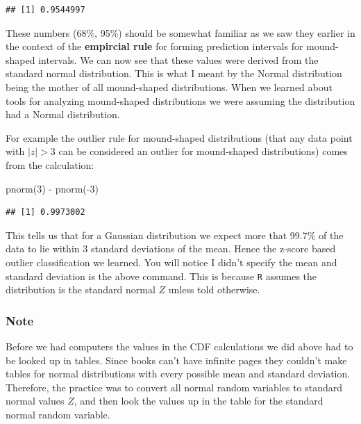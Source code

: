 \documentclass[
]{book}
\newenvironment{Shaded}{\begin{snugshade}}{\end{snugshade}}
\newcommand{\DecValTok}[1]{\textcolor[rgb]{0.00,0.00,0.81}{#1}}
\newcommand{\FunctionTok}[1]{\textcolor[rgb]{0.00,0.00,0.00}{#1}}
\newcommand{\NormalTok}[1]{#1}
\newcommand{\SpecialCharTok}[1]{\textcolor[rgb]{0.00,0.00,0.00}{#1}}
\theoremstyle{definition}
\theoremstyle{definition}
\theoremstyle{definition}
\theoremstyle{definition}
\theoremstyle{remark}
\begin{document}
\begin{verbatim}
## [1] 0.9544997
\end{verbatim}

These numbers (68\%, 95\%) should be somewhat familiar as we saw they earlier in the context of the \textbf{empircial rule} for forming prediction intervals for mound-shaped intervals. We can now see that these values were derived from the standard normal distribution. This is what I meant by the Normal distribution being the mother of all mound-shaped distributions. When we learned about tools for analyzing mound-shaped distributions we were assuming the distribution had a Normal distribution.

For example the outlier rule for mound-shaped distributions (that any data point with \(|z|>3\) can be considered an outlier for mound-shaped distributions) comes from the calculation:

\begin{Shaded}
\begin{Highlighting}[]
\FunctionTok{pnorm}\NormalTok{(}\DecValTok{3}\NormalTok{) }\SpecialCharTok{{-}} \FunctionTok{pnorm}\NormalTok{(}\SpecialCharTok{{-}}\DecValTok{3}\NormalTok{)}
\end{Highlighting}
\end{Shaded}

\begin{verbatim}
## [1] 0.9973002
\end{verbatim}

This tells us that for a Gaussian distribution we expect more that 99.7\% of the data to lie within 3 standard deviations of the mean. Hence the z-score based outlier classification we learned. You will notice I didn't specify the mean and standard deviation is the above command. This is because \texttt{R} assumes the distribution is the standard normal \(Z\) unless told otherwise.

\hypertarget{note}{%
\subsubsection{Note}\label{note}}

Before we had computers the values in the CDF calculations we did above had to be looked up in tables. Since books can't have infinite pages they couldn't make tables for normal distributions with every possible mean and standard deviation. Therefore, the practice was to convert all normal random variables to standard normal values \(Z\), and then look the values up in the table for the standard normal random variable.
\end{document}

